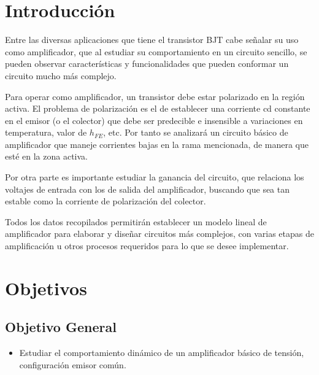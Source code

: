 \documentclass[12pt, a4paper]{article}
\begin{document}
    \newpage

    \section{Introducción}

    Entre las diversas aplicaciones que tiene el transistor BJT cabe señalar su uso como amplificador, que al estudiar su comportamiento en un circuito sencillo, se pueden observar características y funcionalidades que pueden conformar un circuito mucho más complejo.
    
    Para operar como amplificador, un transistor debe estar polarizado en la región activa. El problema de polarización es el de establecer una corriente cd constante en el emisor (o el colector) que debe ser predecible e insensible a variaciones en temperatura, valor de $h_{FE}$, etc. Por tanto se analizará un circuito básico de amplificador que maneje corrientes bajas en la rama mencionada, de manera que esté en la zona activa.

    Por otra parte es importante estudiar la ganancia del circuito, que relaciona los voltajes de entrada con los de salida del amplificador, buscando que sea tan estable como la corriente de polarización del colector.
    
    Todos los datos recopilados permitirán establecer un modelo lineal de amplificador para elaborar y diseñar circuitos más complejos, con varias etapas de amplificación u otros procesos requeridos para lo que se desee implementar.

    \newpage

    \section{Objetivos}
    
    \subsection{Objetivo General}
    \begin{itemize}
        \item Estudiar el comportamiento dinámico de un amplificador básico de tensión, configuración emisor común.
    \end{itemize}
\end{document}
